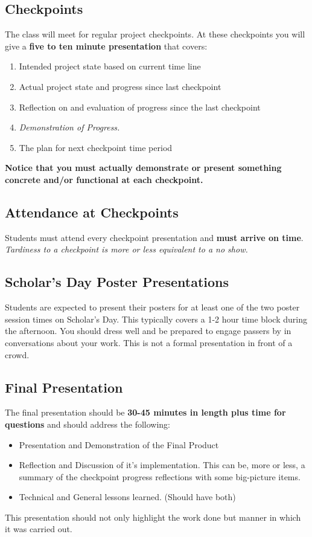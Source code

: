 \documentclass[10pt]{article}
\begin{document}
\subsection{Checkpoints}

The class will meet for regular project checkpoints. At these checkpoints you will give a \textbf{five to ten minute presentation} that covers:
\begin{enumerate}
\item Intended project state based on current time line
\item Actual project state and progress since last checkpoint
\item Reflection on and evaluation of progress since the last checkpoint
\item \textit{Demonstration of Progress.} 
\item The plan for next checkpoint time period
\end{enumerate}
\textbf{Notice that you must actually demonstrate or present something concrete and/or functional at each checkpoint.}

\subsection{Attendance at Checkpoints}

Students must attend every checkpoint presentation and \textbf{must arrive on time}.  \textit{Tardiness to a checkpoint is more or less equivalent to a no show.}


\subsection{Scholar's Day Poster Presentations}

Students are expected to present their posters for at least one of the two poster session times on Scholar's Day.  This typically covers a 1-2 hour time block during the afternoon.  You should dress well and be prepared to engage passers by in conversations about your work.  This is not a formal presentation in front of a crowd.    

\subsection{Final Presentation}
 
The final presentation should be \textbf{30-45 minutes in length plus time for questions} and should address the following:
\begin{itemize}
\item Presentation and Demonstration of the Final Product
\item Reflection and Discussion of it's implementation. This can be, more or less, a summary of the checkpoint progress reflections with some big-picture items.
\item Technical and General lessons learned. (Should have both)
\end{itemize}
This presentation should not only highlight the work done but manner in which it was carried out.
\end{document}
